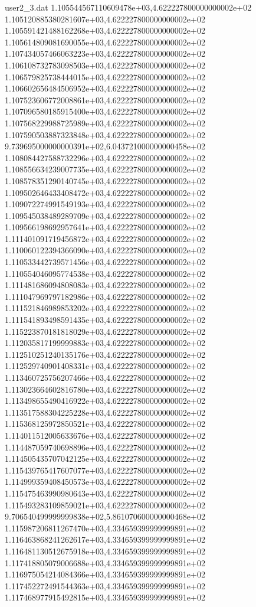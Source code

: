 \begin{filecontents}{user2_3.dat}
1.105544567110609478e+03,4.622227800000000002e+02
1.105120885380281607e+03,4.622227800000000002e+02
1.105591421488162268e+03,4.622227800000000002e+02
1.105614809081690055e+03,4.622227800000000002e+02
1.107434057466063223e+03,4.622227800000000002e+02
1.106108732783098503e+03,4.622227800000000002e+02
1.106579825738444015e+03,4.622227800000000002e+02
1.106602656484506952e+03,4.622227800000000002e+02
1.107523606772008861e+03,4.622227800000000002e+02
1.107096580185915400e+03,4.622227800000000002e+02
1.107568229988725989e+03,4.622227800000000002e+02
1.107590503887323848e+03,4.622227800000000002e+02
9.739695000000000391e+02,6.043721000000000458e+02
1.108084427588732296e+03,4.622227800000000002e+02
1.108556634239007735e+03,4.622227800000000002e+02
1.108578351290140745e+03,4.622227800000000002e+02
1.109502646433408472e+03,4.622227800000000002e+02
1.109072274991549193e+03,4.622227800000000002e+02
1.109545038489289709e+03,4.622227800000000002e+02
1.109566198692957641e+03,4.622227800000000002e+02
1.111401091719456872e+03,4.622227800000000002e+02
1.110060122394366090e+03,4.622227800000000002e+02
1.110533442739571456e+03,4.622227800000000002e+02
1.110554046095774538e+03,4.622227800000000002e+02
1.111481686094808083e+03,4.622227800000000002e+02
1.111047969797182986e+03,4.622227800000000002e+02
1.111521846989853202e+03,4.622227800000000002e+02
1.111541893498591435e+03,4.622227800000000002e+02
1.115223870181818029e+03,4.622227800000000002e+02
1.112035817199999883e+03,4.622227800000000002e+02
1.112510251240135176e+03,4.622227800000000002e+02
1.112529740901408331e+03,4.622227800000000002e+02
1.113460725756207466e+03,4.622227800000000002e+02
1.113023664602816780e+03,4.622227800000000002e+02
1.113498655490416922e+03,4.622227800000000002e+02
1.113517588304225228e+03,4.622227800000000002e+02
1.115368125972850521e+03,4.622227800000000002e+02
1.114011512005633676e+03,4.622227800000000002e+02
1.114487059740698896e+03,4.622227800000000002e+02
1.114505435707042125e+03,4.622227800000000002e+02
1.115439765417607077e+03,4.622227800000000002e+02
1.114999359408450573e+03,4.622227800000000002e+02
1.115475463990980643e+03,4.622227800000000002e+02
1.115493283109859021e+03,4.622227800000000002e+02
9.706540499999999838e+02,5.861070600000000468e+02
1.115987206811267470e+03,4.334659399999999891e+02
1.116463868241262617e+03,4.334659399999999891e+02
1.116481130512675918e+03,4.334659399999999891e+02
1.117418805079006688e+03,4.334659399999999891e+02
1.116975054214084366e+03,4.334659399999999891e+02
1.117452272491544363e+03,4.334659399999999891e+02
1.117468977915492815e+03,4.334659399999999891e+02

\end{filecontents}
